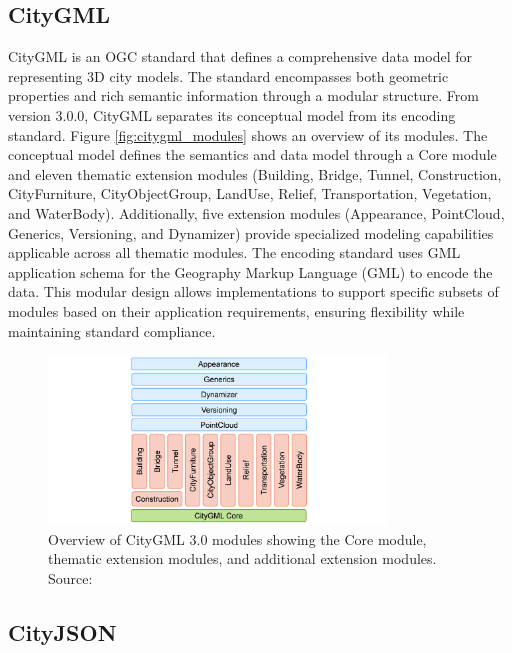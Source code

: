 \subsection{CityGML}
\label{rw:citygml}
CityGML is an OGC standard \citep{CityGML} that defines a comprehensive data model for representing 3D city models. The standard encompasses both geometric properties and rich semantic information through a modular structure. From version 3.0.0, CityGML separates its conceptual model from its encoding standard. Figure \autoref{fig:citygml_modules} shows an overview of its modules. The conceptual model defines the semantics and data model through a Core module and eleven thematic extension modules (Building, Bridge, Tunnel, Construction, CityFurniture, CityObjectGroup, LandUse, Relief, Transportation, Vegetation, and WaterBody). Additionally, five extension modules (Appearance, PointCloud, Generics, Versioning, and Dynamizer) provide specialized modeling capabilities applicable across all thematic modules. The encoding standard uses GML application schema for the Geography Markup Language (GML) \citep{gml} to encode the data. This modular design allows implementations to support specific subsets of modules based on their application requirements, ensuring flexibility while maintaining standard compliance.

\begin{figure}[htbp]
  \centering
  \includegraphics[width=0.8\textwidth]{figs/related_work_theoretical_bg/citygml3modules.png}
  \caption[CityGML 3.0 Module Overview]{Overview of CityGML 3.0 modules showing the Core module, thematic extension modules, and additional extension modules. Source: \citep{CityGML}}
  \label{fig:citygml_modules}
\end{figure}

\subsection{CityJSON}
\label{rw:cityjson}

